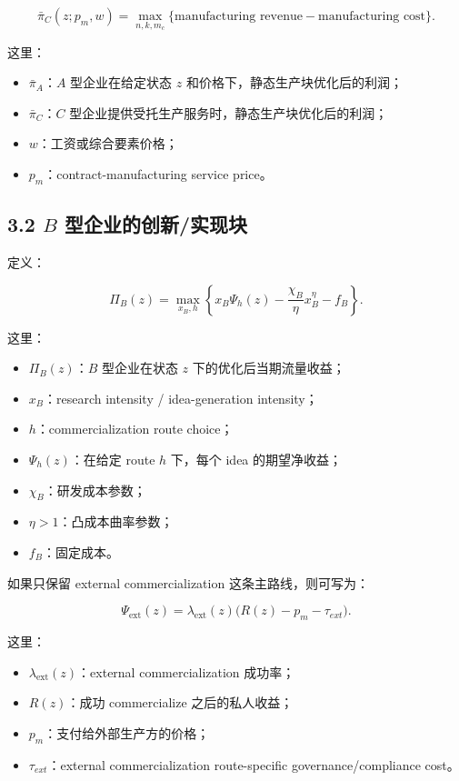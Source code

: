 \documentclass[12pt]{ctexart}
\begin{document}
\[
\bar{\pi}_C(z;p_m,w)
=
\max_{n,k,m_c}
\{\text{manufacturing revenue}-\text{manufacturing cost}\}.
\]

这里：

\begin{itemize}[leftmargin=2em]
    \item \(\bar{\pi}_A\)：\(A\) 型企业在给定状态 \(z\) 和价格下，静态生产块优化后的利润；
    \item \(\bar{\pi}_C\)：\(C\) 型企业提供受托生产服务时，静态生产块优化后的利润；
    \item \(w\)：工资或综合要素价格；
    \item \(p_m\)：contract-manufacturing service price。
\end{itemize}

\subsection{3.2 \(B\) 型企业的创新/实现块}

定义：

\[
\Pi_B(z)
=
\max_{x_B,h}
\left\{
x_B\Psi_h(z)-\frac{\chi_B}{\eta}x_B^\eta-f_B
\right\}.
\]

这里：

\begin{itemize}[leftmargin=2em]
    \item \(\Pi_B(z)\)：\(B\) 型企业在状态 \(z\) 下的优化后当期流量收益；
    \item \(x_B\)：research intensity / idea-generation intensity；
    \item \(h\)：commercialization route choice；
    \item \(\Psi_h(z)\)：在给定 route \(h\) 下，每个 idea 的期望净收益；
    \item \(\chi_B\)：研发成本参数；
    \item \(\eta>1\)：凸成本曲率参数；
    \item \(f_B\)：固定成本。
\end{itemize}

如果只保留 external commercialization 这条主路线，则可写为：

\[
\Psi_{\text{ext}}(z)
=
\lambda_{\text{ext}}(z)\bigl(R(z)-p_m-\tau_{ext}\bigr).
\]

这里：

\begin{itemize}[leftmargin=2em]
    \item \(\lambda_{\text{ext}}(z)\)：external commercialization 成功率；
    \item \(R(z)\)：成功 commercialize 之后的私人收益；
    \item \(p_m\)：支付给外部生产方的价格；
    \item \(\tau_{ext}\)：external commercialization route-specific governance/compliance cost。
\end{itemize}
\end{document}
